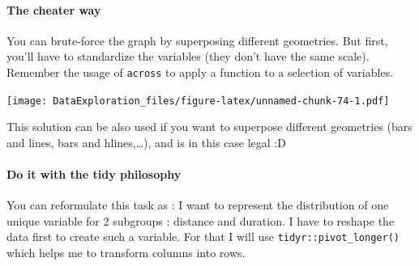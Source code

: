 \documentclass[
]{book}
\newenvironment{Shaded}{\begin{snugshade}}{\end{snugshade}}
\newcommand{\ControlFlowTok}[1]{\textcolor[rgb]{0.13,0.29,0.53}{\textbf{#1}}}
\newcommand{\DataTypeTok}[1]{\textcolor[rgb]{0.13,0.29,0.53}{#1}}
\newcommand{\KeywordTok}[1]{\textcolor[rgb]{0.13,0.29,0.53}{\textbf{#1}}}
\newcommand{\NormalTok}[1]{#1}
\newcommand{\OperatorTok}[1]{\textcolor[rgb]{0.81,0.36,0.00}{\textbf{#1}}}
\newcommand{\StringTok}[1]{\textcolor[rgb]{0.31,0.60,0.02}{#1}}
\begin{document}
\hypertarget{the-cheater-way}{%
\paragraph{The cheater way}\label{the-cheater-way}}

You can brute-force the graph by superposing different geometries. But first, you'll have to standardize the variables (they don't have the same scale). Remember the usage of \texttt{across} to apply a function to a selection of variables.

\begin{Shaded}
\end{Shaded}

\texttt{[image: DataExploration\_files/figure-latex/unnamed-chunk-74-1.pdf]}

This solution can be also used if you want to superpose different geometries (bars and lines, bars and hlines,\ldots), and is in this case legal :D

\hypertarget{do-it-with-the-tidy-philosophy}{%
\paragraph{Do it with the tidy philosophy}\label{do-it-with-the-tidy-philosophy}}

You can reformulate this task as : I want to represent the distribution of one unique variable for 2 subgroups : distance and duration. I have to reshape the data first to create such a variable. For that I will use \texttt{tidyr::pivot\_longer()} which helps me to transform columns into rows.
\end{document}

